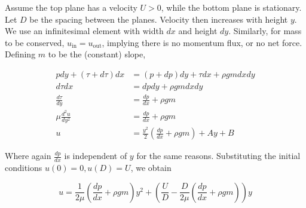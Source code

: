 \documentclass[12pt]{article}
\begin{document}
Assume the top plane has a velocity $U>0$, while the bottom plane is stationary. Let $D$ be the spacing between the planes. Velocity then increases with height $y$. We use an infinitesimal element with width $dx$ and height $dy$. Similarly, for mass to be conserved, $u_{\text{in}} = u_{\text{out}}$, implying there is no momentum flux, or no net force. Defining $m$ to be the (constant) slope,

\begin{align*}
    pdy + (\tau + d\tau)dx &= (p+dp)dy + \tau dx + \rho gm dxdy \\
    d\tau dx &= dpdy + \rho gm dxdy \\
    \frac{d\tau}{dy} &= \frac{dp}{dx} + \rho gm \\
    \mu \frac{d^2u}{dy^2} &= \frac{dp}{dx} + \rho gm \\
    u &= \frac{y^2}{2}\left(\frac{dp}{dx} + \rho gm\right) + Ay + B
\end{align*}

Where again $\frac{dp}{dx}$ is independent of $y$ for the same reasons. Substituting the initial conditions $u(0) = 0, u(D) = U$, we obtain

\begin{equation}
    u = \frac{1}{2\mu} \left(\frac{dp}{dx} + \rho gm\right) y^2 + \left(\frac{U}{D} - \frac{D}{2\mu} \left(\frac{dp}{dx} + \rho gm\right) \right) y
\end{equation}
\end{document}
